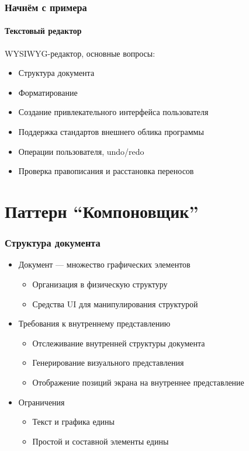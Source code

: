 \documentclass{../../slides-style}
\begin{document}
    \begin{frame}
        \frametitle{Начнём с примера}
        \framesubtitle{Текстовый редактор}
        WYSIWYG-редактор, основные вопросы:
        \begin{itemize}
            \item Структура документа
            \item Форматирование
            \item Создание привлекательного интерфейса пользователя
            \item Поддержка стандартов внешнего облика программы
            \item Операции пользователя, undo/redo
            \item Проверка правописания и расстановка переносов
        \end{itemize}
    \end{frame}

    \section{Паттерн ``Компоновщик''}

    \begin{frame}
        \frametitle{Структура документа}
        \begin{itemize}
            \item Документ --- множество графических элементов
            \begin{itemize}
                \item Организация в физическую структуру
                \item Средства UI для манипулирования структурой
            \end{itemize}
            \item Требования к внутреннему представлению
            \begin{itemize}
                \item Отслеживание внутренней структуры документа
                \item Генерирование визуального представления
                \item Отображение позиций экрана на внутреннее представление
            \end{itemize}
            \item Ограничения
            \begin{itemize}
                \item Текст и графика едины
                \item Простой и составной элементы едины
            \end{itemize}
        \end{itemize}
    \end{frame}
\end{document}
